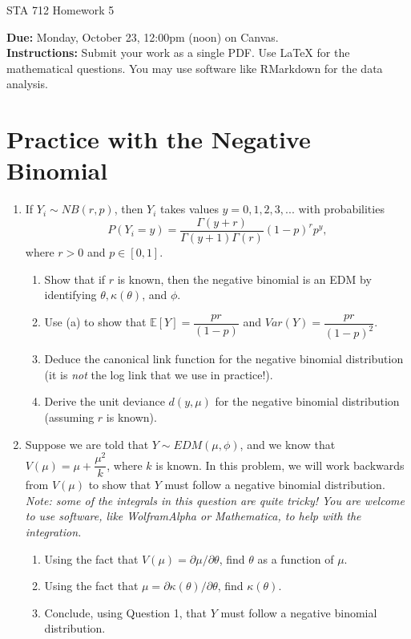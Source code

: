 \documentclass[11pt]{article}
\begin{document}
\begin{center}
\Large
STA 712 Homework 5\\
\normalsize
\vspace{5mm}
\end{center}

\noindent \textbf{Due:} Monday, October 23, 12:00pm (noon) on Canvas.\\ 

\noindent \textbf{Instructions:} Submit your work as a single PDF. Use LaTeX for the mathematical questions. You may use software like RMarkdown for the data analysis.

\section*{Practice with the Negative Binomial}

\begin{enumerate}
\item If $Y_i \sim NB(r, p)$, then $Y_i$ takes values $y = 0, 1, 2, 3, ...$ with probabilities
$$P(Y_i = y) = \dfrac{\Gamma(y + r)}{\Gamma(y + 1)\Gamma(r)} (1 - p)^r p^y,$$
where $r > 0$ and $p \in [0,1]$.

\begin{enumerate}
\item Show that if $r$ is known, then the negative binomial is an EDM by identifying $\theta, \kappa(\theta)$, and $\phi$.
\item Use (a) to show that $\mathbb{E}[Y] = \dfrac{pr}{(1-p)}$ and $Var(Y) = \dfrac{p r}{(1 - p)^2}$.
\item Deduce the canonical link function for the negative binomial distribution (it is \textit{not} the log link that we use in practice!).
\item Derive the unit deviance $d(y,\mu)$ for the negative binomial distribution (assuming $r$ is known). 
\end{enumerate}

\item Suppose we are told that $Y \sim EDM(\mu, \phi)$, and we know that $V(\mu) = \mu + \dfrac{\mu^2}{k}$, where $k$ is known. In this problem, we will work backwards from $V(\mu)$ to show that $Y$ must follow a negative binomial distribution. \textit{Note: some of the integrals in this question are quite tricky! You are welcome to use software, like WolframAlpha or Mathematica, to help with the integration.}

\begin{enumerate}
\item Using the fact that $V(\mu) = \partial \mu / \partial \theta$, find $\theta$ as a function of $\mu$.

\item Using the fact that $\mu = \partial \kappa(\theta) / \partial \theta$, find $\kappa(\theta)$.

\item Conclude, using Question 1, that $Y$ must follow a negative binomial distribution.
\end{enumerate}
\end{enumerate}
\end{document}
